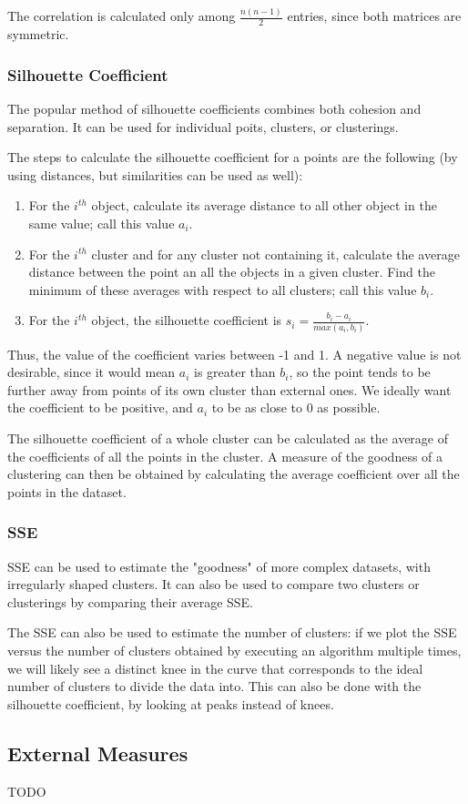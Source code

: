 The correlation is calculated only among $\frac{n(n-1)}{2}$ entries, since both matrices are symmetric.

\subsubsection{Silhouette Coefficient}

The popular method of silhouette coefficients combines both cohesion and separation. It can be used for individual poits, clusters, or clusterings.

The steps to calculate the silhouette coefficient for a points are the following (by using distances, but similarities can be used as well):

\begin{enumerate}
    \item For the $i^{th}$ object, calculate its average distance to all other object in the same value; call this value $a_i$.

    \item For the $i^{th}$ cluster and for any cluster not containing it, calculate the average distance between the point an all the objects in a given cluster. Find the minimum of these averages with respect to all clusters; call this value $b_i$.

    \item For the $i^{th}$ object, the silhouette coefficient is $s_i = \frac{b_i - a_i}{max(a_i,b_i)}$.
\end{enumerate}

Thus, the value of the coefficient varies between -1 and 1. A negative value is not desirable, since it would mean $a_i$ is greater than $b_i$, so the point tends to be further away from points of its own cluster than external ones. We ideally want the coefficient to be positive, and $a_i$ to be as close to 0 as possible.

The silhouette coefficient of a whole cluster can be calculated as the average of the coefficients of all the points in the cluster. A measure of the goodness of a clustering can then be obtained by calculating the average coefficient over all the points in the dataset.

\subsubsection{SSE}

SSE can be used to estimate the "goodness" of more complex datasets, with irregularly shaped clusters. It can also be used to compare two clusters or clusterings by comparing their average SSE.

The SSE can also be used to estimate the number of clusters: if we plot the SSE versus the number of clusters obtained by executing an algorithm multiple times, we will likely see a distinct knee in the curve that corresponds to the ideal number of clusters to divide the data into. This can also be done with the silhouette coefficient, by looking at peaks instead of knees.

\subsection{External Measures}

TODO